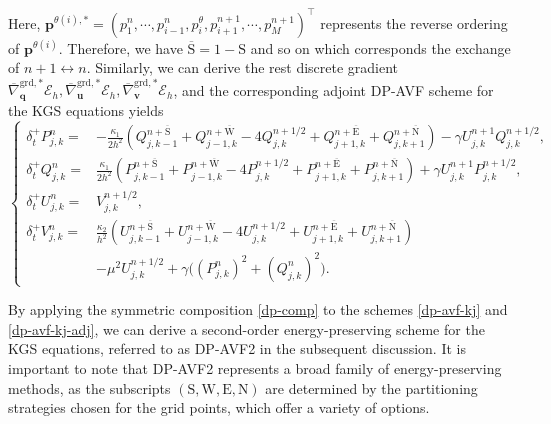 \documentclass[fleqn,11pt]{elsarticle}
\numberwithin{equation}{section}
\begin{document}
Here, $\bm p^{\theta(i),*} = (p_1^{n}, \cdots, p_{i-1}^{n}, p_i^{\theta}, p_{i+1}^{n+1}, \cdots, p_M^{n+1})^\top$ represents the reverse ordering of $\bm p^{\theta(i)}$. Therefore, we have $\overline{\text{S}}=1-{\text{S}}$ and so on which corresponds the exchange of $n+1\leftrightarrow n$. Similarly, we can derive the rest discrete gradient $\overline{\nabla}^{\text{grd},*}_{\bm q}\mathcal{E}_h, \overline{\nabla}^{\text{grd},*}_{\bm u}\mathcal{E}_h, \overline{\nabla}^{\text{grd},*}_{\bm v}\mathcal{E}_h$, and the corresponding adjoint DP-AVF scheme for the KGS equations yields
\begin{equation}\label{dp-avf-kj-adj}
	\left\{\begin{aligned}
		\delta_t^+P_{j,k}^n= & -\frac{\kappa_1}{2h^2}(Q_{j,k-1}^{n+\overline{\text{S}}}+Q_{j-1, k}^{n+\overline{\text{W}}} - 4 Q_{j,k}^{n+1/2}+ Q_{j+1, k}^{n+\overline{\text{E}}} + Q_{j, k+1}^{n+\overline{\text{N}}})-\gamma U_{j,k}^{n+1}Q_{j,k}^{n+1/2},                                     \\
		\delta_t^+Q_{j,k}^n= & \frac{\kappa_1}{2h^2}(P_{j,k-1}^{n+\overline{\text{S}}}+P_{j-1, k}^{n+\overline{\text{W}}} - 4 P_{j,k}^{n+1/2}+ P_{j+1, k}^{n+\overline{\text{E}}} + P_{j, k+1}^{n+\overline{\text{N}}})+\gamma U_{j,k}^{n+1}P_{j,k}^{n+1/2},                                      \\
		\delta_t^+U_{j,k}^n= & V_{j,k}^{n+1/2},                                                                                                                                                                                                                                                   \\
		\delta_t^+V_{j,k}^n= & \frac{\kappa_2}{h^2}(U_{j,k-1}^{n+\overline{\text{S}}}+U_{j-1, k}^{n+\overline{\text{W}}} - 4 U_{j,k}^{n+1/2}+ U_{j+1, k}^{n+\overline{\text{E}}} + U_{j, k+1}^{n+\overline{\text{N}}})\\
		&-\mu^2 U_{j,k}^{n+1/2}+\gamma \big((P_{j,k}^{n})^2+(Q_{j,k}^{n})^2\big).
	\end{aligned}\right.
\end{equation}

By applying the symmetric composition \eqref{dp-comp} to the schemes \eqref{dp-avf-kj} and \eqref{dp-avf-kj-adj}, we can derive a second-order energy-preserving scheme for the KGS equations, referred to as DP-AVF2 in the subsequent discussion. It is important to note that DP-AVF2 represents a broad family of energy-preserving methods, as the subscripts $(\text{S}, \text{W}, \text{E}, \text{N})$ are determined by the partitioning strategies chosen for the grid points, which offer a variety of options.
\end{document}
